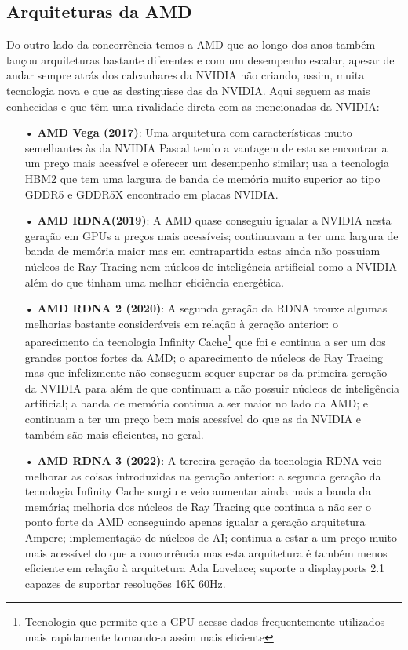 \documentclass[a4paper,11pt,]{report}
\begin{document}
\subsection{Arquiteturas da AMD}
Do outro lado da concorrência temos a AMD que ao longo dos anos também lançou arquiteturas bastante diferentes e com um desempenho escalar, apesar de andar sempre atrás dos calcanhares da NVIDIA não criando, assim, muita tecnologia nova e que as destinguisse das da NVIDIA. Aqui seguem as mais conhecidas e que têm uma rivalidade direta com as mencionadas da NVIDIA:
\begin{itemize}
 \item[•] \textbf{AMD Vega (2017)}: Uma arquitetura com características muito semelhantes às da NVIDIA Pascal tendo a vantagem de esta se encontrar a um preço mais acessível e oferecer um desempenho similar; usa a tecnologia HBM2 que tem uma largura de banda de memória muito superior ao tipo GDDR5 e GDDR5X encontrado em placas NVIDIA.
  \item[•] \textbf{AMD RDNA(2019)}: A AMD quase conseguiu igualar a NVIDIA nesta geração em GPUs a preços mais acessíveis; continuavam a ter uma largura de banda de memória maior mas em contrapartida estas ainda não possuiam núcleos de Ray Tracing nem núcleos de inteligência artificial como a NVIDIA além do que tinham uma melhor eficiência energética.
\pagebreak
  \item[•] \textbf{AMD RDNA 2 (2020)}: A segunda geração da RDNA trouxe algumas melhorias bastante consideráveis em relação à geração anterior: o aparecimento da tecnologia Infinity Cache\footnote{Tecnologia que permite que a GPU acesse dados frequentemente utilizados mais rapidamente tornando-a assim mais eficiente} que foi e continua a ser um dos grandes pontos fortes da AMD; o aparecimento de núcleos de Ray Tracing mas que infelizmente não conseguem sequer superar os da primeira geração da NVIDIA para além de que continuam a não possuir núcleos de inteligência artificial; a banda de memória continua a ser maior no lado da AMD; e continuam a ter um preço bem mais acessível do que as da NVIDIA e também são mais eficientes, no geral.
 \item[•] \textbf{AMD RDNA 3 (2022)}: A terceira geração da tecnologia RDNA veio melhorar as coisas introduzidas na geração anterior: a segunda geração da tecnologia Infinity Cache surgiu e veio aumentar ainda mais a banda da memória; melhoria dos núcleos de Ray Tracing que continua a não ser o ponto forte da AMD conseguindo apenas igualar a geração arquitetura Ampere; implementação de núcleos de AI; continua a estar a um preço muito mais acessível do que a concorrência mas esta arquitetura é também menos eficiente em relação à arquitetura Ada Lovelace; suporte a displayports 2.1 capazes de suportar resoluções 16K 60Hz.
\end{itemize}
\end{document}
